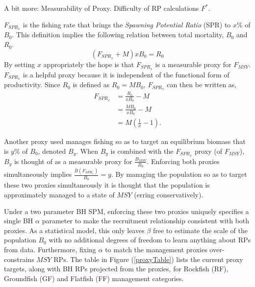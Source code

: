 
{\color{blue}
A bit more: Measurability of Proxy. Difficulty of RP calculations $F^*$.
}

%
$F_{SPR_x}$ is the fishing rate that brings the {\it Spawning Potential Ratio} (SPR) to $x\%$ of $B_0$.
This definition implies the following relation between total mortality, $B_0$ and $R_0$.
%
\begin{equation}
	(F_{SPR_x}+M)x B_0 = R_0 \nonumber
\end{equation}
%
By setting $x$ appropriately the hope is that $F_{SPR_x}$ is a measurable proxy 
for $F_{MSY}$. $F_{SPR_x}$ is a helpful proxy because it is independent of the 
functional form of productivity. Since $R_0$ is defined as $R_0=M B_0$, $F_{SPR_x}$ 
can then be written as,
%
\begin{align}
F_{SPR_x} &= \frac{R_0}{x B_0}-M \nonumber\\
	&= \frac{M B_0}{x B_0}-M \nonumber\\ 
	&= M\left(\frac{1}{x}-1\right)\label{fspr}.
\end{align}


Another proxy used manages fishing so as to target an equilibrium biomass 
that is $y\%$ of $B_0$, denoted $B_y$. 
When $B_y$ is combined with the $F_{SPR_x}$ proxy (of $F_{MSY}$), $B_y$ is 
thought of as a measurable proxy for $\frac{B_{MSY}}{B_0}$. Enforcing both 
proxies simultaneously implies $\frac{\bar B(F_{SPR_x})}{B_0}=y$. By managing
the population so as to target these two proxies simultaneously it is thought 
that the population is approximately managed to a state of $MSY$ (erring conservatively). 

%
Under a two parameter BH SPM, enforcing these two proxies uniquely 
specifies a single BH $\alpha$ parameter to make the recruitment 
relationship consistent with both proxies.  %
As a statistical model, this only leaves $\beta$ free to estimate the scale of the 
population $B_0$ with no additional degrees of freedom to learn anything about 
RPs from data. Furthermore, fixing $\alpha$ to match the management proxies 
over-constrains $MSY$ RPs. 
The table in Figure (\ref{proxyTable}) lists the current proxy targets, along with BH RPs 
projected from the proxies, for Rockfish (RF), Groundfish (GF) and Flatfish (FF) 
management categories. %

